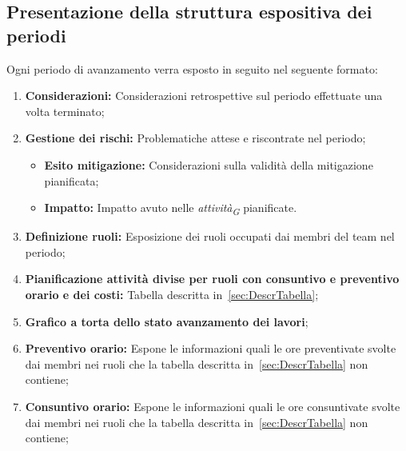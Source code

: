 \subsection{Presentazione della struttura espositiva dei periodi}
Ogni periodo di avanzamento verra esposto in seguito nel seguente formato:
\begin{enumerate}
    \item \textbf{Considerazioni:} Considerazioni retrospettive sul periodo effettuate una volta terminato;
    \item \textbf{Gestione dei rischi:} Problematiche attese e riscontrate nel periodo;
        \begin{itemize}
            \item \textbf{Esito mitigazione:} Considerazioni sulla validità della mitigazione pianificata;
            \item \textbf{Impatto:} Impatto avuto nelle \textit{attività}\textsubscript{\textit{G}} pianificate.
        \end{itemize}
    \item \textbf{Definizione ruoli:} Esposizione dei ruoli occupati dai membri del team nel periodo;
    \item \textbf{Pianificazione attività divise per ruoli con consuntivo e preventivo orario e dei costi:} Tabella descritta in~\ref{sec:DescrTabella};
    \item \textbf{Grafico a torta dello stato avanzamento dei lavori};
    \item \textbf{Preventivo orario:} Espone le informazioni quali le ore preventivate svolte dai membri nei ruoli che la tabella descritta in~\ref{sec:DescrTabella} non contiene;
    \item \textbf{Consuntivo orario:} Espone le informazioni quali le ore consuntivate svolte dai membri nei ruoli che la tabella descritta in~\ref{sec:DescrTabella} non contiene;


\end{enumerate}
